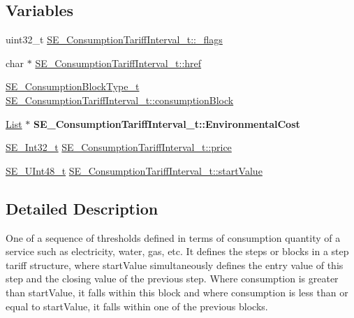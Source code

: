 \subsection*{Variables}
\begin{DoxyCompactItemize}
\item 
uint32\+\_\+t \hyperlink{group__ConsumptionTariffInterval_gacbc5360ac90b58365b561193009cf141}{S\+E\+\_\+\+Consumption\+Tariff\+Interval\+\_\+t\+::\+\_\+flags}
\item 
char $\ast$ \hyperlink{group__ConsumptionTariffInterval_ga443637f1365ce8d25ceb058b8dd9d93d}{S\+E\+\_\+\+Consumption\+Tariff\+Interval\+\_\+t\+::href}
\item 
\hyperlink{group__ConsumptionBlockType_ga526f797922e4c3009d50c28f457c462e}{S\+E\+\_\+\+Consumption\+Block\+Type\+\_\+t} \hyperlink{group__ConsumptionTariffInterval_gab62382c449daf3ca552062780486fc3e}{S\+E\+\_\+\+Consumption\+Tariff\+Interval\+\_\+t\+::consumption\+Block}
\item 
\mbox{\label{group__ConsumptionTariffInterval_ga3d46f1ff55de83b9192e3fd4b9950494}} 
\hyperlink{structList}{List} $\ast$ {\bfseries S\+E\+\_\+\+Consumption\+Tariff\+Interval\+\_\+t\+::\+Environmental\+Cost}
\item 
\hyperlink{group__Int32_gaa7afc819cfc8033c5fa408e34da8b71a}{S\+E\+\_\+\+Int32\+\_\+t} \hyperlink{group__ConsumptionTariffInterval_ga92c4173ce74527498b5aa9fa2782ee5f}{S\+E\+\_\+\+Consumption\+Tariff\+Interval\+\_\+t\+::price}
\item 
\hyperlink{group__UInt48_gaa15d726fc29126d24b991437334d77a0}{S\+E\+\_\+\+U\+Int48\+\_\+t} \hyperlink{group__ConsumptionTariffInterval_ga6bdef05db8c5f945867838c51904afc1}{S\+E\+\_\+\+Consumption\+Tariff\+Interval\+\_\+t\+::start\+Value}
\end{DoxyCompactItemize}


\subsection{Detailed Description}
One of a sequence of thresholds defined in terms of consumption quantity of a service such as electricity, water, gas, etc. It defines the steps or blocks in a step tariff structure, where start\+Value simultaneously defines the entry value of this step and the closing value of the previous step. Where consumption is greater than start\+Value, it falls within this block and where consumption is less than or equal to start\+Value, it falls within one of the previous blocks. 

